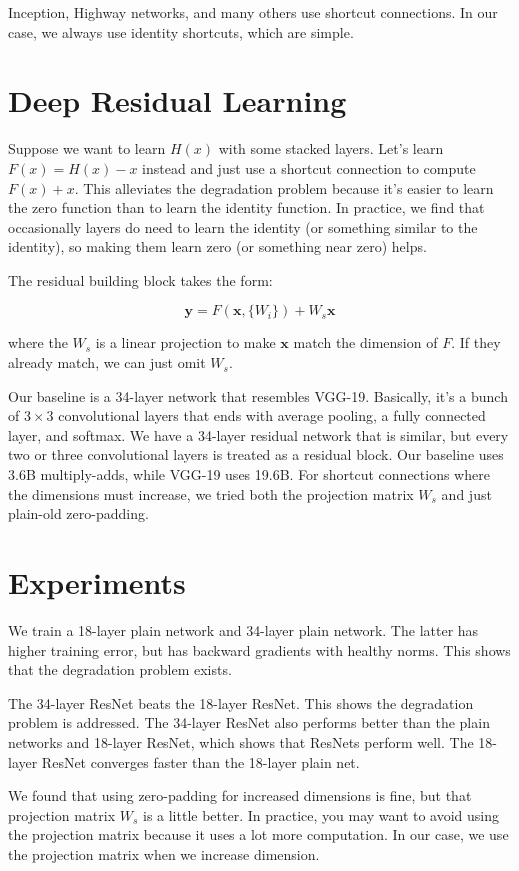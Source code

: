 \documentclass[a4paper]{article}
\begin{document}
Inception, Highway networks, and many others use shortcut connections. In our
case, we always use identity shortcuts, which are simple.

\section{Deep Residual Learning}
Suppose we want to learn $H(x)$ with some stacked layers. Let's learn $F(x)
= H(x) - x$ instead and just use a shortcut connection to compute $F(x) + x$.
This alleviates the degradation problem because it's easier to learn the
zero function than to learn the identity function. In practice, we find that
occasionally layers do need to learn the identity (or something similar to
the identity), so making them learn zero (or something near zero) helps.

The residual building block takes the form:

$$
\mathbf{y} = F(\mathbf{x}, \{W_i\}) + W_s \mathbf{x}
$$

where the $W_s$ is a linear projection to make $\mathbf{x}$ match the dimension
of $F$. If they already match, we can just omit $W_s$.

Our baseline is a 34-layer network that resembles VGG-19. Basically, it's a
bunch of $3 \times 3$ convolutional layers that ends with average pooling,
a fully connected layer, and softmax. We have a 34-layer residual network that
is similar, but every two or three convolutional layers is treated as a
residual block. Our baseline uses 3.6B multiply-adds, while VGG-19 uses 19.6B.
For shortcut connections where the dimensions must increase, we tried both the
projection matrix $W_s$ and just plain-old zero-padding.

\section{Experiments}
We train a 18-layer plain network and 34-layer plain network. The latter has
higher training error, but has backward gradients with healthy norms. This
shows that the degradation problem exists.

The 34-layer ResNet beats the 18-layer ResNet. This shows the degradation
problem is addressed. The 34-layer ResNet also performs better than the plain
networks and 18-layer ResNet, which shows that ResNets perform well. The
18-layer ResNet converges faster than the 18-layer plain net.

We found that using zero-padding for increased dimensions is fine, but that
projection matrix $W_s$ is a little better. In practice, you may want to avoid
using the projection matrix because it uses a lot more computation. In our
case, we use the projection matrix when we increase dimension.
\end{document}
